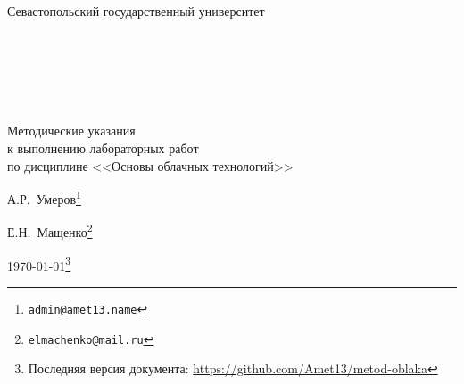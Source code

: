
\begin{center}

\Large{Севастопольский государственный университет}

{~}\bigskip %

{~}\bigskip

{~}\bigskip

\Huge{Методические указания \\
к выполнению лабораторных работ \\
по дисциплине <<Основы облачных технологий>>} %

\vspace{1em}

\Large{А.Р.~Умеров}\footnote{\texttt{admin@amet13.name}}

\Large{Е.Н.~Мащенко}\footnote{\texttt{elmachenko@mail.ru}}

\Large{\today}\footnote{Последняя версия документа: \url{https://github.com/Amet13/metod-oblaka}}

\end{center}

\clearpage %
